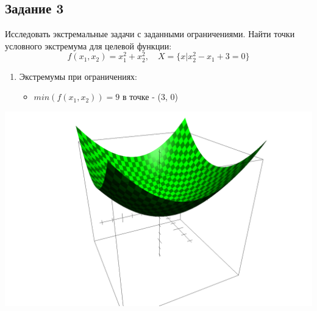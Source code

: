 \documentclass[a4paper, 12pt]{article}   	%
\begin{document}
\subsection{Задание 3}
    
    Исследовать экстремальные задачи с заданными ограничениями. Найти точки условного экстремума для целевой функции:
    \begin{equation*}
        f(x_1, x_2) = x_1^2 + x_2^2, \quad X = \{x | x_2^2 - x_1 + 3 = 0 \}
    \end{equation*}
   
   \begin{enumerate}
        \item Экстремумы при ограничениях:
        \begin{itemize}
            \item $min(f(x_1, x_2)) = 9$ в точке - (3, 0)
        \end{itemize}
    \end{enumerate}
    
    \begin{center}
        \begin{minipage}{0.5\linewidth}
            \includegraphics[width=\linewidth]{img/3}
        \end{minipage}
    \end{center}
    
    
\end{document}
